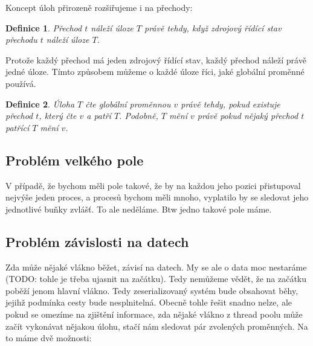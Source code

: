 \documentclass[10pt,a4paper,notitlepage]{report}
\newtheorem{definition}{Definice}
\begin{document}
Koncept úloh přirozeně rozšiřujeme i na přechody:
\begin{definition}
Přechod $t$ náleží úloze $T$ právě tehdy, když zdrojový řídící stav přechodu $t$ náleží úloze $T$.
\end{definition}
Protože každý přechod má jeden zdrojový řídící stav, každý přechod náleží právě jedné úloze. Tímto způsobem můžeme o každé úloze říci, jaké globální proměnné používá.

\begin{definition}
Úloha $T$ čte globální proměnnou $v$ právě tehdy, pokud existuje přechod $t$, který čte $v$ a patří $T$. Podobně, $T$ mění $v$ právě pokud nějaký přechod $t$ patřící $T$ mění $v$.
\end{definition}



\subsection{Problém velkého pole}
V případě, že bychom měli pole takové, že by na každou jeho pozici přistupoval nejvýše jeden proces,
a procesů bychom měli mnoho, vyplatilo by se sledovat jeho jednotlivé buňky zvlášť. To ale neděláme. Btw jedno takové pole máme.

\subsection{Problém závislosti na datech}
Zda může nějaké vlákno běžet, závisí na datech. My se ale o data moc nestaráme (TODO: tohle je třeba ujasnit na začátku). Tedy nemůžeme vědět, že na začátku poběží jenom hlavní vlákno. Tedy zeserializovaný systém bude obsahovat běhy, jejihž podmínka cesty bude nesplnitelná. Obecně tohle řešit snadno nelze, ale pokud se omezíme na zjištění informace, zda nějaké vlákno z thread poolu může začít vykonávat nějakou úlohu, stačí nám sledovat pár zvolených proměnných. Na to máme dvě možnosti:
\end{document}
